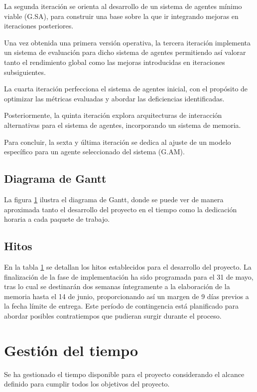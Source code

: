 La segunda iteración se orienta al desarrollo de un sistema de agentes mínimo viable (G.SA), para construir una base sobre la que ir integrando mejoras en iteraciones posteriores. 

Una vez obtenida una primera versión operativa, la tercera iteración implementa un sistema de evaluación para dicho sistema de agentes permitiendo así valorar tanto el rendimiento global como las mejoras introducidas en iteraciones subsiguientes. 

La cuarta iteración perfecciona el sistema de agentes inicial, con el propósito de optimizar las métricas evaluadas y abordar las deficiencias identificadas.

Posteriormente, la quinta iteración explora arquitecturas de interacción alternativas para el sistema de agentes, incorporando un sistema de memoria.

Para concluir, la sexta y última iteración se dedica al ajuste de un modelo específico para un agente seleccionado del sistema (G.AM).

\subsection{Diagrama de Gantt}

La figura \ref{} ilustra el diagrama de Gantt, donde se puede ver de manera aproximada tanto el desarrollo del proyecto en el tiempo como la dedicación horaria a cada paquete de trabajo.

\subsection{Hitos}

En la tabla \ref{} se detallan los hitos establecidos para el desarrollo del proyecto. La finalización de la fase de implementación ha sido programada para el 31 de mayo, tras lo cual se destinarán dos semanas íntegramente a la elaboración de la memoria hasta el 14 de junio, proporcionando así un margen de 9 días previos a la fecha límite de entrega. Este período de contingencia está planificado para abordar posibles contratiempos que pudieran surgir durante el proceso.

\section{Gestión del tiempo}
Se ha gestionado el tiempo disponible para el proyecto considerando el alcance definido para cumplir todos los objetivos del proyecto. 

